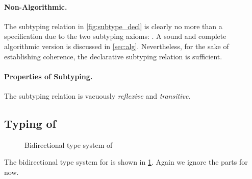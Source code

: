 \paragraph{Non-Algorithmic.}
The subtyping relation in \cref{fig:subtype_decl} is clearly no more than a
specification due to the two subtyping axioms: . A sound
and complete algorithmic version is discussed in \cref{sec:alg}. Nevertheless,
for the sake of establishing coherence, the declarative subtyping relation is
sufficient.


\paragraph{Properties of Subtyping.}
The subtyping relation is vacuously \textit{reflexive} and \textit{transitive}.



\subsection{Typing of \namee}


\begin{figure}[t]
  \centering
{}
  \caption{Bidirectional type system of \namee}
  \label{fig:type_system}
\end{figure}

\renewcommand{\rulehl}[1]{#1}



The bidirectional type system for \namee is shown in \cref{fig:type_system}.
Again we ignore the  parts for now.


\begin{comment}
Unlike the development of \oname, which first presents a type assignment
specification, \Cref{fig:type_system} directly present the bidirectional type
system of \namee.
Unfortunately, we found that their declarative type
system is incoherent in nature (even with all the syntactic restrictions).
\jeremy{perhaps add a counter example somewhere?} Again, the reader is advised
to continue ignoring the gray-shaded parts until \cref{sec:elaboration}.
\tom{The above story is a bit confusing to me. Is it the case that the
     \oname paper already was aware of the coherence problem with its
     declarative type system and for that reason (and inference) presented
     a bidirection type system as well? If so, that's not clear.} \jeremy{I
     remember at one point Bruno and I believed the declarative system is
     coherent, it's just hard to prove. Then I found a counterexample. That was
     after \tname paper.  }
\end{comment}


